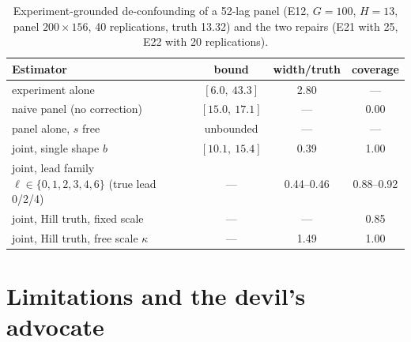 \begin{table}[htbp]
\centering\small
\caption{Experiment-grounded de-confounding of a 52-lag panel (E12, $G = 100$, $H = 13$, panel $200 \times 156$, 40 replications, truth 13.32) and the two repairs (E21 with 25, E22 with 20 replications).}
\label{surr:tab:joint}
\begin{tabular}{lccc}
\toprule
Estimator & bound & width/truth & coverage \\
\midrule
experiment alone & $[6.0,\ 43.3]$ & 2.80 & --- \\
naive panel (no correction) & $[15.0,\ 17.1]$ & --- & 0.00 \\
panel alone, $s$ free & unbounded & --- & --- \\
joint, single shape $b$ & $[10.1,\ 15.4]$ & 0.39 & 1.00 \\
joint, lead family $\ell \in \{0,1,2,3,4,6\}$ (true lead 0/2/4) & --- & 0.44--0.46 & 0.88--0.92 \\
joint, Hill truth, fixed scale & --- & --- & 0.85 \\
joint, Hill truth, free scale $\kappa$ & --- & 1.49 & 1.00 \\
\bottomrule
\end{tabular}
\end{table}

\section{Limitations and the devil's advocate}

